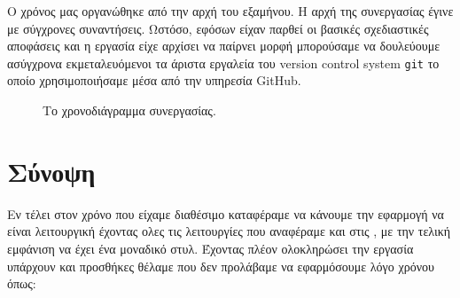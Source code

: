 \documentclass[nonacm, language=english, language=greek]{acmart}
\newcommand{\en}[1]{\textlatin{#1}}
\newcommand{\src}[1]{\texttt{\en{#1}}}
\begin{document}
Ο χρόνος μας οργανώθηκε από την αρχή του εξαμήνου. Η αρχή της συνεργασίας έγινε
με σύγχρονες συναντήσεις. Ωστόσο, εφόσων είχαν παρθεί οι βασικές σχεδιαστικές
αποφάσεις και η εργασία είχε αρχίσει να παίρνει μορφή μπορούσαμε να δουλεύουμε
ασύγχρονα εκμεταλευόμενοι τα άριστα εργαλεία του \en{version control system}
\src{git} \cite{git} το οποίο χρησιμοποιήσαμε μέσα από την υπηρεσία
\en{GitHub}.

% 
% 

\begin{figure}[!htb]
\begin{center}
    
\end{center}
    \caption{Το χρονοδιάγραμμα συνεργασίας.}
\end{figure}


\section{Σύνοψη}

Εν τέλει στον χρόνο που είχαμε διαθέσιμο καταφέραμε να κάνουμε την εφαρμογή να είναι λειτουργική έχοντας ολες τις λειτουργίες που αναφέραμε και στις , με την τελική εμφάνιση να έχει ένα μοναδικό στυλ.
Έχοντας πλέον ολοκληρώσει την εργασία υπάρχουν και προσθήκες θέλαμε που δεν προλάβαμε να εφαρμόσουμε λόγο χρόνου όπως:
\end{document}
